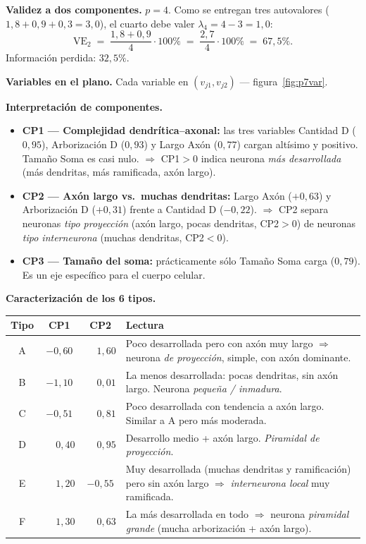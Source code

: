 \documentclass[11pt,a4paper]{article}
\begin{document}
\begin{solbox}
\textbf{Validez a dos componentes.} $p=4$. Como se entregan tres autovalores ($1{,}8+0{,}9+0{,}3=3{,}0$), el cuarto debe valer $\lambda_4 = 4-3 = 1{,}0$:
\[
\mathrm{VE}_2 \;=\; \frac{1{,}8+0{,}9}{4}\cdot 100\% \;=\; \frac{2{,}7}{4}\cdot 100\% \;=\; \boxed{67{,}5\%}.
\]
Información perdida: $\boxed{32{,}5\%}$.

\textbf{Variables en el plano.} Cada variable en $(v_{j1},v_{j2})$ — figura~\ref{fig:p7var}.

\textbf{Interpretación de componentes.}
\begin{itemize}[noitemsep,leftmargin=*]
\item \textbf{CP1 — Complejidad dendrítica--axonal:} las tres variables Cantidad D ($0{,}95$), Arborización D ($0{,}93$) y Largo Axón ($0{,}77$) cargan altísimo y positivo. Tamaño Soma es casi nulo. $\Rightarrow$ CP1$>0$ indica neurona \emph{más desarrollada} (más dendritas, más ramificada, axón largo).
\item \textbf{CP2 — Axón largo vs.\ muchas dendritas:} Largo Axón ($+0{,}63$) y Arborización D ($+0{,}31$) frente a Cantidad D ($-0{,}22$). $\Rightarrow$ CP2 separa neuronas \emph{tipo proyección} (axón largo, pocas dendritas, CP2$>0$) de neuronas \emph{tipo interneurona} (muchas dendritas, CP2$<0$).
\item \textbf{CP3 — Tamaño del soma:} prácticamente sólo Tamaño Soma carga ($0{,}79$). Es un eje específico para el cuerpo celular.
\end{itemize}

\textbf{Caracterización de los 6 tipos.}
\begin{center}\small
\begin{tabular}{cccp{8cm}}\toprule
Tipo & CP1 & CP2 & Lectura\\\midrule
A & $-0{,}60$ & $\phantom{-}1{,}60$ & Poco desarrollada pero con axón muy largo $\Rightarrow$ neurona \emph{de proyección}, simple, con axón dominante.\\
B & $-1{,}10$ & $\phantom{-}0{,}01$ & La menos desarrollada: pocas dendritas, sin axón largo. Neurona \emph{pequeña / inmadura}.\\
C & $-0{,}51$ & $\phantom{-}0{,}81$ & Poco desarrollada con tendencia a axón largo. Similar a A pero más moderada.\\
D & $\phantom{-}0{,}40$ & $\phantom{-}0{,}95$ & Desarrollo medio + axón largo. \emph{Piramidal de proyección}.\\
E & $\phantom{-}1{,}20$ & $-0{,}55$ & Muy desarrollada (muchas dendritas y ramificación) pero sin axón largo $\Rightarrow$ \emph{interneurona local} muy ramificada.\\
F & $\phantom{-}1{,}30$ & $\phantom{-}0{,}63$ & La más desarrollada en todo $\Rightarrow$ neurona \emph{piramidal grande} (mucha arborización + axón largo).\\\bottomrule
\end{tabular}\end{center}
\end{solbox}
\end{document}
